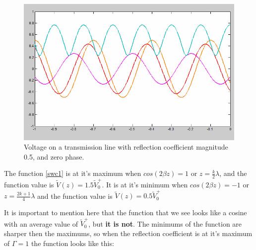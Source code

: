 \documentclass{ximera}
\begin{document}
\begin{itemize}
\begin{figure}[htbp]
\begin{center}
\includegraphics[scale=0.3]{../jpg/specialcase.jpg}
\end{center}
\caption{Voltage on a transmission line with reflection coefficient magnitude 0.5, and zero phase.}
\label{reflcoeffvid}
\end{figure}



The function \ref{swc1} is at it's maximum 
when $cos(2 \beta z)=1$ or $z=\frac{k}{2} \lambda$, and the function
value is $\tilde{V}(z)=1.5\tilde{V}_0^+  $. It is at it's
minimum when  $cos(2 \beta z)=-1$ or $z=\frac{2 k +1}{4} \lambda$
and the function value is $\tilde{V}(z)=0.5 \tilde{V}_0^+$

It is important to mention here that the function that we see looks
like a cosine with an average value of $ \tilde{V}_0^+ $, but {\bf it is not}.
The minimums of the function are sharper then the maximums, so when
the reflection coefficient is at it's maximum of $\Gamma =1$ the
function looks like this:



\end{itemize}
\end{document}

